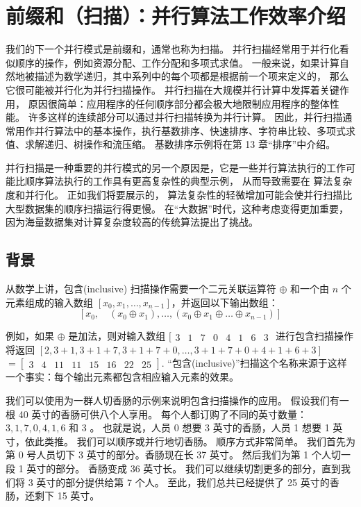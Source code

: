 \section{前缀和（扫描）：并行算法工作效率介绍}
我们的下一个并行模式是前缀和，通常也称为扫描。 并行扫描经常用于并行化看似顺序的操作，例如资源分配、工作分配和多项式求值。 
一般来说，如果计算自然地被描述为数学递归，其中系列中的每个项都是根据前一个项来定义的，
那么它很可能被并行化为并行扫描操作。 并行扫描在大规模并行计算中发挥着关键作用，
原因很简单：应用程序的任何顺序部分都会极大地限制应用程序的整体性能。 许多这样的连续部分可以通过并行扫描转换为并行计算。 
因此，并行扫描通常用作并行算法中的基本操作，执行基数排序、快速排序、字符串比较、多项式求值、求解递归、树操作和流压缩。 
基数排序示例将在第 13 章“排序”中介绍。

并行扫描是一种重要的并行模式的另一个原因是，它是一些并行算法执行的工作可能比顺序算法执行的工作具有更高复杂性的典型示例，
从而导致需要在 算法复杂度和并行化。 正如我们将要展示的，
算法复杂性的轻微增加可能会使并行扫描比大型数据集的顺序扫描运行得更慢。 
在“大数据”时代，这种考虑变得更加重要，因为海量数据集对计算复杂度较高的传统算法提出了挑战。

\subsection{背景}
从数学上讲，包含(inclusive) 扫描操作需要一个二元关联运算符 $\oplus$ 
和一个由 $n$ 个元素组成的输入数组 $\left[x_{0}, x_{1}, \ldots, x_{n-1}\right] $，并返回以下输出数组：
$$
\left[x_{0}, \quad\left(x_{0} \oplus x_{1}\right), \ldots,\left(x_{0} \oplus x_{1} \oplus \ldots \oplus x_ {n-1}\right)\right]
$$

例如，如果 $\oplus$ 是加法，则对输入数组 $[\begin{array}{llllllll}
3 & 1 & 7 & 0 & 4 & 1 & 6 & 3
\end{array}$ 进行包含扫描操作将返回 
$[2,3+1,3+1+7,3+1+7+0, \ldots, 3+1+7+0+4+1+6+3]$ $ =[\begin{array}{llllllll}
3 & 4 & 11 & 11 & 15 & 16 & 22 & 25
\end{array}]$. “包含(inclusive)”扫描这个名称来源于这样一个事实：每个输出元素都包含相应输入元素的效果。

我们可以使用为一群人切香肠的示例来说明包含扫描操作的应用。 假设我们有一根 40 英寸的香肠可供八个人享用。 
每个人都订购了不同的英寸数量： $3,1,7,0,4,1,6$ 和 3 。 
也就是说，人员 0 想要 3 英寸的香肠，人员 1 想要 1 英寸，依此类推。 我们可以顺序或并行地切香肠。 顺序方式非常简单。 
我们首先为第 0 号人员切下 3 英寸的部分。香肠现在长 37 英寸。 然后我们为第 1 个人切一段 1 英寸的部分。
香肠变成 36 英寸长。 我们可以继续切割更多的部分，直到我们将 3 英寸的部分提供给第 7 个人。 
至此，我们总共已经提供了 25 英寸的香肠，还剩下 15 英寸。

